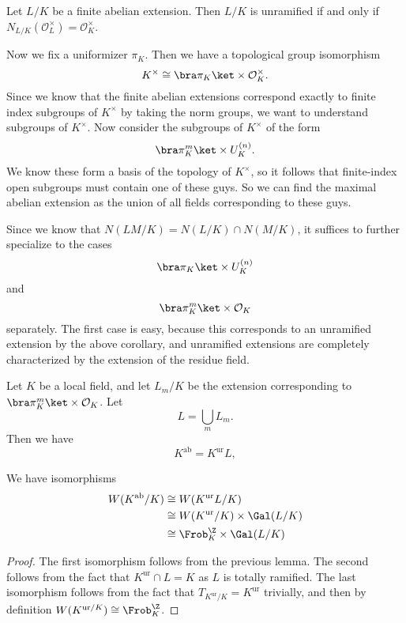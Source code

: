 \documentclass[a4paper]{article}
\begin{document}
\begin{cor}
  Let $L/K$ be a finite abelian extension. Then $L/K$ is unramified if and only if $N_{L/K}(\mathcal{O}_L^\times) = \mathcal{O}_K^\times$.
\end{cor}

Now we fix a uniformizer $\pi_K$. Then we have a topological group isomorphism
\[
  K^\times \cong \bra \pi_K\ket \times \mathcal{O}_K^\times.
\]
Since we know that the finite abelian extensions correspond exactly to finite index subgroups of $K^\times$ by taking the norm groups, we want to understand subgroups of $K^\times$. Now consider the subgroups of $K^\times$ of the form
\[
  \bra \pi_K^m\ket \times U_K^{(n)}.
\]
We know these form a basis of the topology of $K^\times$, so it follows that finite-index open subgroups must contain one of these guys. So we can find the maximal abelian extension as the union of all fields corresponding to these guys.

Since we know that $N(LM/K) = N(L/K) \cap N(M/K)$, it suffices to further specialize to the cases
\[
  \bra \pi_K\ket \times U_K^{(n)}
\]
and
\[
  \bra \pi_K^m\ket \times \mathcal{O}_K
\]
separately. The first case is easy, because this corresponds to an unramified extension by the above corollary, and unramified extensions are completely characterized by the extension of the residue field.

\begin{lemma}
  Let $K$ be a local field, and let $L_m/K$ be the extension corresponding to $\bra \pi_K^m \ket \times \mathcal{O}_K$. Let
  \[
    L = \bigcup_m L_m. %
  \]
  Then we have
  \[
    K^{\mathrm{ab}} = K^{\mathrm{ur}}L,
  \]
\end{lemma}

\begin{lemma}
  We have isomorphisms
  \begin{align*}
    W(K^{\mathrm{ab}}/K) &\cong W(K^{\mathrm{ur}} L/K) \\
    &\cong W(K^{\mathrm{ur}}/K) \times \Gal(L/K)\\
    &\cong \Frob_K^\Z \times \Gal(L/K)
  \end{align*}
\end{lemma}

\begin{proof}
  The first isomorphism follows from the previous lemma. The second follows from the fact that $K^{\mathrm{ur}} \cap L = K$ as $L$ is totally ramified. The last isomorphism follows from the fact that $T_{K^{\mathrm{ur}}/K} = K^{\mathrm{ur}}$ trivially, and then by definition $W(K^{\mathrm{ur}/K}) \cong \Frob_K^\Z$.
\end{proof}
\end{document}
